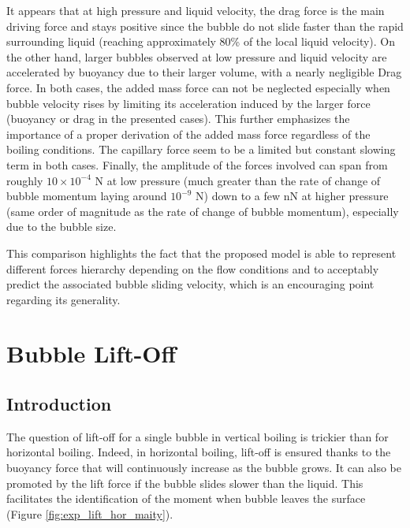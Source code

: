 \npar


It appears that at high pressure and liquid velocity, the drag force is the main driving force and stays positive since the bubble do not slide faster than the rapid surrounding liquid (reaching approximately 80\% of the local liquid velocity). On the other hand, larger bubbles observed at low pressure and liquid velocity are accelerated by buoyancy due to their larger volume, with a nearly negligible Drag force. In both cases, the added mass force can not be neglected especially when bubble velocity rises by limiting its acceleration induced by the larger force (buoyancy or drag in the presented cases). This further emphasizes the importance of a proper derivation of the added mass force regardless of the boiling conditions. The capillary force seem to be a limited but constant slowing term in both cases. Finally, the amplitude of the forces involved can span from roughly $10\times 10^{-4}$ N at low pressure (much greater than the rate of change of bubble momentum laying around $10^{-9}$ N) down to a few nN at higher pressure (same order of magnitude as the rate of change of bubble momentum), especially due to the bubble size.

\npar

This comparison highlights the fact that the proposed model is able to represent different forces hierarchy depending on the flow conditions and to acceptably predict the associated bubble sliding velocity, which is an encouraging point regarding its generality.


\clearpage

\section{Bubble Lift-Off}
\label{sec:liftoff}

\subsection{Introduction}

The question of lift-off for a single bubble in vertical boiling is trickier than for horizontal boiling. Indeed, in horizontal boiling, lift-off is ensured thanks to the buoyancy force that will continuously increase as the bubble grows. It can also be promoted by the lift force if the bubble slides slower than the liquid. This facilitates the identification of the moment when bubble leaves the surface (Figure \ref{fig:exp_lift_hor_maity}).

